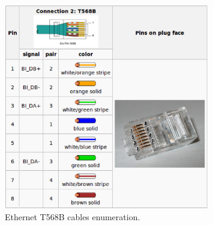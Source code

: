 \documentclass[11pt
  , a4paper
  , article
  , oneside
  , showtrims
]{memoir}
\begin{document}
\begin{figure}[!htb]
	\centering
	\includegraphics[width=0.80\textwidth]{./pictures/ser_cable.eps}
	\caption{
		Ethernet T568B cables enumeration\cite{CSTIAEIA}.
	}
	\label{fig:ser_cable}   
\end{figure}
\end{document}
